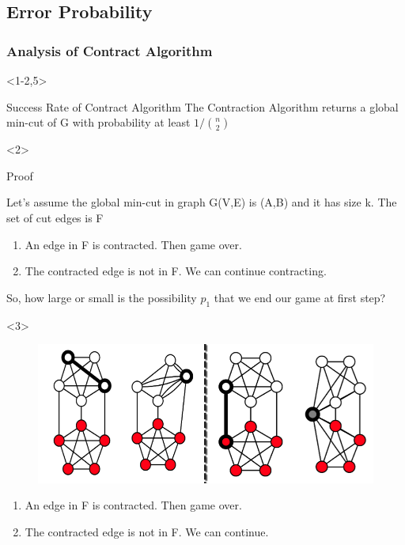 \documentclass{beamer}
\begin{document}
\subsection{Error Probability}
\begin{frame}
\frametitle{Analysis of Contract Algorithm}
\begin{overlayarea}{\linewidth}{\textheight}
\begin{onlyenv}<1-2,5>
\begin{block}{Success Rate of Contract Algorithm}
The Contraction Algorithm returns a global min-cut of G with probability at least $1/\binom n2$	
\end{block}
\end{onlyenv}

\begin{onlyenv}<2>

\begin{block}{Proof}

Let's assume the global min-cut in graph G(V,E) is (A,B) and it has size k. The set of cut edges is F
\begin{enumerate}[{Case}.1]
\item An edge in F is contracted. Then game over.
\item The contracted edge is not in F. We can continue contracting.
\end{enumerate}
So, how large or small is the possibility $p_1$ that we end our game at first step? \\
\end{block}
\end{onlyenv}
\begin{onlyenv}<3>
	\begin{figure}
		\includegraphics[scale=0.4]{images/contract}
	\end{figure}	
	\begin{enumerate}[{Case}.1]
\item An edge in F is contracted. Then game over.
\item The contracted edge is not in F. We can continue.
\end{enumerate}


\end{onlyenv}
\end{overlayarea}
\end{frame}
\end{document}
